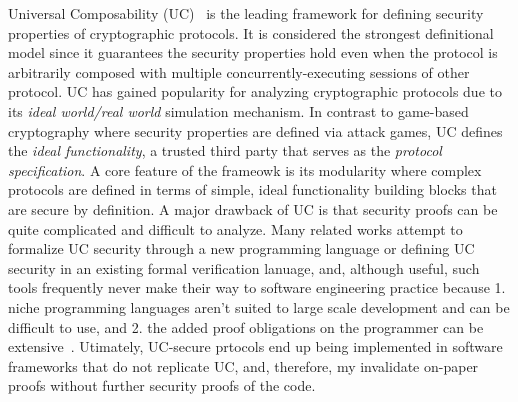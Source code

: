 Universal Composability (UC)~\cite{canettiUC} is the leading framework for defining security properties of cryptographic protocols.
It is considered the strongest definitional model since it guarantees the security properties hold even when the protocol is arbitrarily composed with
multiple concurrently-executing sessions of other protocol.
UC has gained popularity for analyzing cryptographic protocols due to its \emph{ideal world/real world} simulation mechanism.
In contrast to game-based cryptography where security properties are defined via attack games,
UC defines the \emph{ideal functionality}, a trusted third party that serves as the \emph{protocol specification}.
A core feature of the frameowk is its modularity where complex protocols are defined in terms of simple, ideal functionality building blocks that are secure by definition. 
A major drawback of UC is that security proofs can be quite complicated and difficult to analyze. 
Many related works \cite{ilc, easyuc, ipdl, etc} attempt to formalize UC security through a new programming language or defining UC security in an existing formal verification lanuage, and,  
although useful, such tools frequently never make their way to software engineering practice because 1. niche programming languages aren't suited to large scale development and can be difficult to use, and 2. the added proof obligations on the programmer can be extensive~\cite{ironfleet}.
Utimately, UC-secure prtocols end up being implemented in software frameworks that do not replicate UC, and, therefore, my invalidate on-paper proofs without further security proofs of the code.

